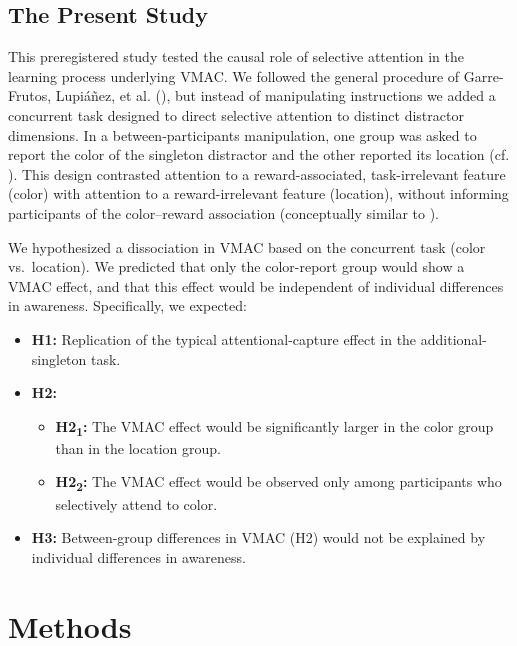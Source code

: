 \documentclass[
  man,
  floatsintext,
  longtable,
  nolmodern,
  notxfonts,
  notimes,
  mask,
  colorlinks=true,linkcolor=blue,citecolor=blue,urlcolor=blue]{apa7}
\begin{document}
\subsection{The Present Study}\label{the-present-study}

This preregistered study tested the causal role of selective attention
in the learning process underlying VMAC. We followed the general
procedure of Garre-Frutos, Lupiáñez, et al.
(), but instead of manipulating
instructions we added a concurrent task designed to direct selective
attention to distinct distractor dimensions. In a between-participants
manipulation, one group was asked to report the color of the singleton
distractor and the other reported its location (cf.
). This design contrasted
attention to a reward-associated, task-irrelevant feature (color) with
attention to a reward-irrelevant feature (location), without informing
participants of the color--reward association (conceptually similar to
).

We hypothesized a dissociation in VMAC based on the concurrent task
(color vs.~location). We predicted that only the color-report group
would show a VMAC effect, and that this effect would be independent of
individual differences in awareness. Specifically, we expected:

\begin{itemize}
\item
  \textbf{H1:} Replication of the typical attentional-capture effect in
  the additional-singleton task.
\item
  \textbf{H2:}

  \begin{itemize}
  \item
    \textbf{H2\textsubscript{1}:} The VMAC effect would be significantly
    larger in the color group than in the location group.
  \item
    \textbf{H2\textsubscript{2}:} The VMAC effect would be observed only
    among participants who selectively attend to color.
  \end{itemize}
\item
  \textbf{H3:} Between-group differences in VMAC (H2) would not be
  explained by individual differences in awareness.
\end{itemize}

\section{Methods}\label{methods}
\end{document}

